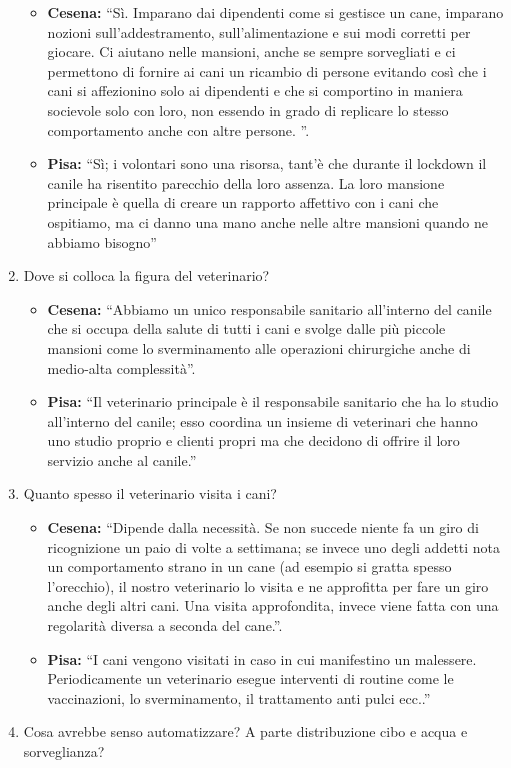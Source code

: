 \documentclass{report}
\begin{document}
\begin{enumerate}
  \begin{itemize}
  \tightlist
  \item
    \textbf{Cesena:} ``Sì. Imparano dai dipendenti come si gestisce un
    cane, imparano nozioni sull'addestramento, sull'alimentazione e sui
    modi corretti per giocare. Ci aiutano nelle mansioni, anche se
    sempre sorvegliati e ci permettono di fornire ai cani un ricambio di
    persone evitando così che i cani si affezionino solo ai dipendenti e
    che si comportino in maniera socievole solo con loro, non essendo in
    grado di replicare lo stesso comportamento anche con altre persone.
    ''.
  \item
    \textbf{Pisa: }``Sì; i volontari sono una risorsa, tant'è che
    durante il lockdown il canile ha risentito parecchio della loro
    assenza. La loro mansione principale è quella di creare un rapporto
    affettivo con i cani che ospitiamo, ma ci danno una mano anche nelle
    altre mansioni quando ne abbiamo bisogno''
  \end{itemize}
\item
  Dove si colloca la figura del veterinario?

  \begin{itemize}
  \tightlist
  \item
    \textbf{Cesena:} ``Abbiamo un unico responsabile sanitario
    all'interno del canile che si occupa della salute di tutti i cani e
    svolge dalle più piccole mansioni come lo sverminamento alle
    operazioni chirurgiche anche di medio-alta complessità''.
  \item
    \textbf{Pisa: }``Il veterinario principale è il responsabile
    sanitario che ha lo studio all'interno del canile; esso coordina un
    insieme di veterinari che hanno uno studio proprio e clienti propri
    ma che decidono di offrire il loro servizio anche al canile.''
  \end{itemize}
\item
  Quanto spesso il veterinario visita i cani?

  \begin{itemize}
  \tightlist
  \item
    \textbf{Cesena:} ``Dipende dalla necessità. Se non succede niente fa
    un giro di ricognizione un paio di volte a settimana; se invece uno
    degli addetti nota un comportamento strano in un cane (ad esempio si
    gratta spesso l'orecchio), il nostro veterinario lo visita e ne
    approfitta per fare un giro anche degli altri cani. Una visita
    approfondita, invece viene fatta con una regolarità diversa a
    seconda del cane.''.
  \item
    \textbf{Pisa: }``I cani vengono visitati in caso in cui manifestino
    un malessere. Periodicamente un veterinario esegue interventi di
    routine come le vaccinazioni, lo sverminamento, il trattamento anti
    pulci ecc..''
  \end{itemize}
\item
  Cosa avrebbe senso automatizzare? A parte distribuzione cibo e acqua e
  sorveglianza?


\end{enumerate}
\end{document}
